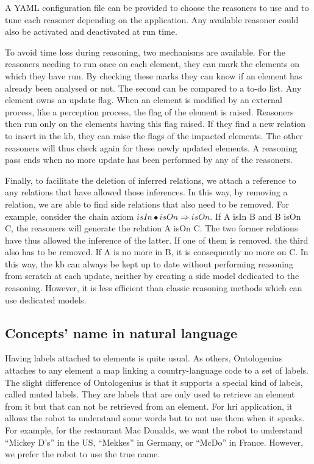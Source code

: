 A YAML configuration file can be provided to choose the reasoners to use and to tune each reasoner depending on the application. Any available reasoner could also be activated and deactivated at run time.

To avoid time loss during reasoning, two mechanisms are available. For the reasoners needing to run once on each element, they can mark the elements on which they have run. By checking these marks they can know if an element has already been analysed or not. The second can be compared to a to-do list. Any element owns an update flag. When an element is modified by an external process, like a perception process, the flag of the element is raised. Reasoners then run only on the elements having this flag raised. If they find a new relation to insert in the \acrshort{kb}, they can raise the flags of the impacted elements. The other reasoners will thus check again for these newly updated elements. A reasoning pass ends when no more update has been performed by any of the reasoners.

Finally, to facilitate the deletion of inferred relations, we attach a reference to any relations that have allowed those inferences. In this way, by removing a relation, we are able to find side relations that also need to be removed. For example, consider the chain axiom $isIn \bullet isOn \Rightarrow isOn$. If A isIn B and B isOn C, the reasoners will generate the relation A isOn C. The two former relations have thus allowed the inference of the latter. If one of them is removed, the third also has to be removed. If A is no more in B, it is consequently no more on C. In this way, the \acrshort{kb} can always be kept up to date without performing reasoning from scratch at each update, neither by creating a side model dedicated to the reasoning. However, it is less efficient than classic reasoning methods which can use dedicated models.

\subsection{Concepts' name in natural language}

Having labels attached to elements is quite usual. As others, Ontologenius attaches to any element a map linking a country-language code to a set of labels. The slight difference of Ontologenius is that it supports a special kind of labels, called muted labels. They are labels that are only used to retrieve an element from it but that can not be retrieved from an element. For \acrshort{hri} application, it allows the robot to understand some words but to not use them when it speaks. For example, for the restaurant Mac Donalds, we want the robot to understand ``Mickey D's'' in the US, ``Mekkes'' in Germany, or ``McDo'' in France. However, we prefer the robot to use the true name.

